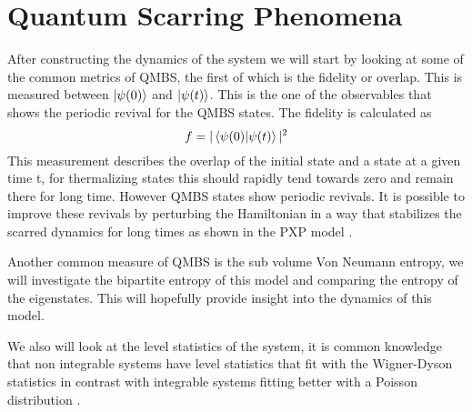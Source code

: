 \section{Quantum Scarring Phenomena}
After constructing the dynamics of the system we will start by looking at some of the common metrics of QMBS, the first of which is the fidelity or overlap. This is measured between $\ket{\psi(0)}$ and $\ket{\psi(t)}$.
This is the one of the observables that shows the periodic revival for the QMBS states. The fidelity is calculated as 
\begin{equation}\label{eq:fidelity}
f = |\bra{\psi(0)}\ket{\psi(t)}|^2
\end{equation}
This measurement describes the overlap of the initial state and a state at a given time t, for thermalizing states this should rapidly tend towards zero and remain there for long time. However QMBS states show periodic revivals. It is possible to improve these revivals by perturbing the Hamiltonian in a way that stabilizes the scarred dynamics for long times as shown in the PXP model \citep{Choi_2019}\citep{Hudomal_drivenPXP}.

Another common measure of QMBS is the sub volume Von Neumann entropy, we will investigate the bipartite entropy of this model and comparing the entropy of the eigenstates. This will hopefully provide insight into the dynamics of this model. 

We also will look at the level statistics of the system, it is common knowledge that non integrable systems have level statistics that fit with the Wigner-Dyson statistics in contrast with integrable systems fitting better with a Poisson distribution \citep{10.21468/SciPostPhys.11.2.037}.


